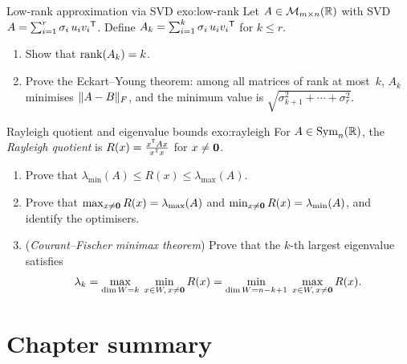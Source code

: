 \begin{exercise}{Low-rank approximation via SVD \challenging}{exo:low-rank}
Let $A\in\mathcal{M}_{m\times n}({\mathbb{R}})$ with SVD\
$A = \sum_{i=1}^r \sigma_i\,u_i{v_i}^{\mathsf{T}}$.
Define $A_k = \sum_{i=1}^k \sigma_i\,u_i{v_i}^{\mathsf{T}}$ for $k\leq r$.
\begin{enumerate}[label=\textup{(\alph*)}]
  \item Show that $\operatorname{rank}(A_k)=k$.
  \item Prove the Eckart--Young theorem:
    among all matrices of rank at most~$k$, $A_k$ minimises
    $\lVert A-B\rVert_F$, and the minimum value is
    $\sqrt{\sigma_{k+1}^2+\cdots+\sigma_r^2}$.
\end{enumerate}
\end{exercise}

\begin{exercise}{Rayleigh quotient and eigenvalue bounds \challenging}%
{exo:rayleigh}
For $A\in\operatorname{Sym}_n({\mathbb{R}})$, the \emph{Rayleigh quotient}
is $R(x) = \frac{{x}^{\mathsf{T}}Ax}{{x}^{\mathsf{T}}x}$ for
$x\neq\mathbf{0}$.
\begin{enumerate}[label=\textup{(\alph*)}]
  \item Prove that $\lambda_{\min}(A)\leq R(x)\leq\lambda_{\max}(A)$.
  \item Prove that $\max_{x\neq\mathbf{0}}R(x) = \lambda_{\max}(A)$
    and $\min_{x\neq\mathbf{0}}R(x) = \lambda_{\min}(A)$, and identify
    the optimisers.
  \item (\emph{Courant--Fischer minimax theorem})
    Prove that the $k$-th largest eigenvalue satisfies
    \[
      \lambda_k = \max_{\dim W = k}\;\min_{x\in W,\,x\neq\mathbf{0}}
        R(x)
      = \min_{\dim W = n-k+1}\;\max_{x\in W,\,x\neq\mathbf{0}} R(x).
    \]
\end{enumerate}
\end{exercise}


\section{Chapter summary}\label{sec:spectral-summary}

